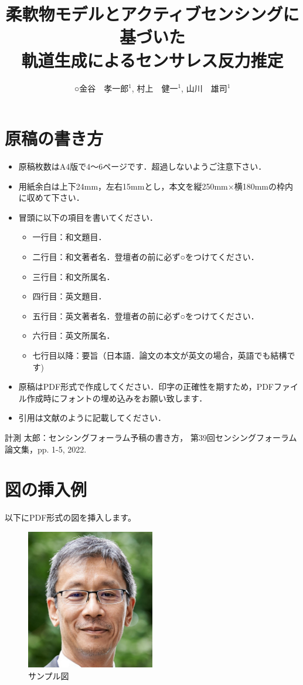 \documentclass[a4paper]{jarticle}
\title{柔軟物モデルとアクティブセンシングに基づいた\\軌道生成によるセンサレス反力推定}
\author{○金谷　孝一郎$^1$, 村上　健一$^1$, 山川　雄司$^1$}
\affiliation{
$^1$ 東京大学}
\begin{document}
\maketitle
\iffalse
\section{原稿の書き方}
\begin{itemize}
\item 原稿枚数はA4版で4～6ページです．超過しないようご注意下さい．
\item 用紙余白は上下24mm，左右15mmとし，本文を縦250mm×横180mmの枠内に収めて下さい．
\item 冒頭に以下の項目を書いてください．
\begin{itemize}
\item 一行目：和文題目．
\item 二行目：和文著者名．登壇者の前に必ず○をつけてください．
\item 三行目：和文所属名．
\item 四行目：英文題目．
\item 五行目：英文著者名．登壇者の前に必ず○をつけてください．
\item 六行目：英文所属名．
\item 七行目以降：要旨（日本語．論文の本文が英文の場合，英語でも結構です)
\end{itemize}
\item 原稿はPDF形式で作成してください．印字の正確性を期すため，PDFファイル作成時にフォントの埋め込みをお願い致します．
\item 引用は文献\cite{ref1}のように記載してください．
\end{itemize}
\begin{thebibliography}{9}
計測 太郎：センシングフォーラム予稿の書き方，
第39回センシングフォーラム論文集，pp. 1-5, 2022.
\end{thebibliography}
\section{図の挿入例}
以下にPDF形式の図を挿入します。

\begin{figure}[htbp]
    \centering
    \includegraphics[width=0.5\textwidth]{example.pdf}
    \caption{サンプル図}
    \label{fig:sample}
\end{figure}
\end{document}
